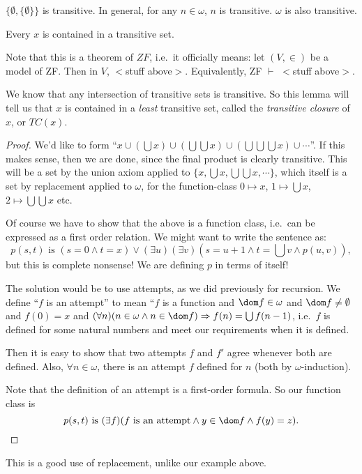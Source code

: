 \documentclass[a4paper]{article}
\begin{document}
\begin{eg}
  $\{\emptyset, \{\emptyset\}\}$ is transitive. In general, for any $n\in \omega$, $n$ is transitive. $\omega$ is also transitive.
\end{eg}

\begin{lemma}
  Every $x$ is contained in a transitive set.
\end{lemma}
Note that this is a theorem of $ZF$, i.e.\ it officially means: let $(V, \in)$ be a model of ZF. Then in $V$, $<$stuff above$>$. Equivalently, ZF $\vdash$ $<$stuff above$>$.

We know that any intersection of transitive sets is transitive. So this lemma will tell us that $x$ is contained in a \emph{least} transitive set, called the \emph{transitive closure} of $x$, or $TC(x)$.

\begin{proof}
  We'd like to form ``$x\cup (\bigcup x)\cup (\bigcup\bigcup x)\cup (\bigcup\bigcup\bigcup x)\cup \cdots$''. If this makes sense, then we are done, since the final product is clearly transitive. This will be a set by the union axiom applied to $\{x, \bigcup x, \bigcup\bigcup x, \cdots\}$, which itself is a set by replacement applied to $\omega$, for the function-class $0\mapsto x$, $1\mapsto \bigcup x$, $2\mapsto \bigcup\bigcup x$ etc.

  Of course we have to show that the above is a function class, i.e.\ can be expressed as a first order relation. We might want to write the sentence as:
  \[
    p(s, t)\text{ is }(s = 0\wedge t = x)\vee (\exists u)(\exists v)(s = u + 1\wedge t = \textstyle{\bigcup} v \wedge p(u, v)),
  \]
  but this is complete nonsense! We are defining $p$ in terms of itself!

  The solution would be to use attempts, as we did previously for recursion. We define ``$f$ is an attempt'' to mean ``$f$ is a function and $\dom f\in \omega$ and $\dom f\not=\emptyset$ and $f(0) = x$ and $(\forall n)(n\in \omega \wedge n\in \dom f)\Rightarrow f(n) = \bigcup f(n - 1)$, i.e.\ $f$ is defined for some natural numbers and meet our requirements when it is defined.

  Then it is easy to show that two attempts $f$ and $f'$ agree whenever both are defined. Also, $\forall n\in \omega$, there is an attempt $f$ defined for $n$ (both by $\omega$-induction).

  Note that the definition of an attempt is a first-order formula. So our function class is
  \[
    p(s, t)\text{ is } (\exists f)(f\text{ is an attempt}\wedge y\in \dom f \wedge f(y) = z).
  \]
\end{proof}
This is a good use of replacement, unlike our example above.
\end{document}
